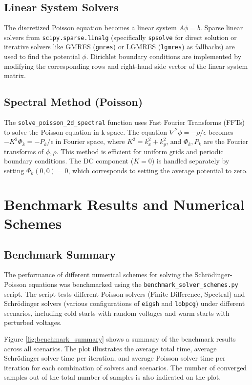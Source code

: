 \documentclass{article}
\begin{document}
\subsection{Linear System Solvers}
The discretized Poisson equation becomes a linear system $A\phi = b$. Sparse linear solvers from \texttt{scipy.sparse.linalg} (specifically \texttt{spsolve} for direct solution or iterative solvers like GMRES (\texttt{gmres}) or LGMRES (\texttt{lgmres}) as fallbacks) are used to find the potential $\phi$. Dirichlet boundary conditions are implemented by modifying the corresponding rows and right-hand side vector of the linear system matrix.

\subsection{Spectral Method (Poisson)}
The \texttt{solve\_poisson\_2d\_spectral} function uses Fast Fourier Transforms (FFTs) to solve the Poisson equation in k-space. The equation $\nabla^2 \phi = -\rho/\epsilon$ becomes $-K^2 \Phi_k = -P_k/\epsilon$ in Fourier space, where $K^2 = k_x^2 + k_y^2$, and $\Phi_k, P_k$ are the Fourier transforms of $\phi, \rho$. This method is efficient for uniform grids and periodic boundary conditions. The DC component ($K=0$) is handled separately by setting $\Phi_k(0,0)=0$, which corresponds to setting the average potential to zero.

\section{Benchmark Results and Numerical Schemes}

\subsection{Benchmark Summary}

The performance of different numerical schemes for solving the Schrödinger-Poisson equations was benchmarked using the \texttt{benchmark\_solver\_schemes.py} script. The script tests different Poisson solvers (Finite Difference, Spectral) and Schrödinger solvers (various configurations of \texttt{eigsh} and \texttt{lobpcg}) under different scenarios, including cold starts with random voltages and warm starts with perturbed voltages.

Figure \ref{fig:benchmark_summary} shows a summary of the benchmark results across all scenarios. The plot illustrates the average total time, average Schrödinger solver time per iteration, and average Poisson solver time per iteration for each combination of solvers and scenarios. The number of converged samples out of the total number of samples is also indicated on the plot.
\end{document}
